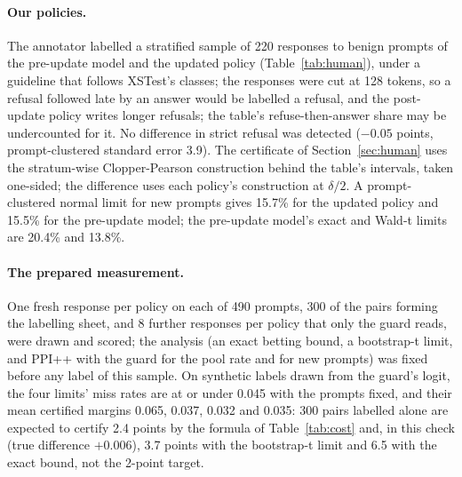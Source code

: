 \paragraph{Our policies.} The annotator labelled a stratified sample of 220 responses to benign prompts of the pre-update
model and the updated policy (Table~\ref{tab:human}), under a guideline that follows XSTest's classes; the responses were
cut at 128 tokens, so a refusal followed late by an answer would be labelled a refusal, and the post-update policy
writes longer refusals; the table's refuse-then-answer share may be undercounted for it. No difference in strict refusal was detected ($-0.05$ points, prompt-clustered standard error 3.9).
The certificate of Section~\ref{sec:human} uses the stratum-wise Clopper-Pearson construction behind the table's
intervals, taken one-sided; the difference uses each policy's construction at $\delta/2$. A prompt-clustered normal limit
for new prompts gives 15.7\% for the updated policy and 15.5\% for the pre-update model; the pre-update model's exact and
Wald-t limits are 20.4\% and 13.8\%.

\begin{table}[t]
\centering
\scriptsize
\setlength{\tabcolsep}{2pt}
\resizebox{\ifdim\width>\textwidth\textwidth\else\width\fi}{!}{}
\caption{Prompt pairs needed to certify a margin on the difference of the two strict refusal rates at $\delta=0.05$, by
normal-type formula at the sheet's rates (difference $-0.0005$, pairing correlation 0.66, guard $\rho^2$ 0.6). The guard
columns assume a gain of 2.5; a design check measured about 1.4, so they are optimistic.}
\label{tab:cost}
\end{table}

\paragraph{The prepared measurement.} One fresh response per policy on each of 490 prompts, 300 of the pairs forming the
labelling sheet, and 8 further responses per policy that only the guard reads, were drawn and scored; the analysis (an
exact betting bound, a bootstrap-t limit, and PPI++ with the guard for the pool rate and for new prompts) was fixed
before any label of this sample. On synthetic labels drawn from the guard's logit, the four limits' miss rates are at or
under 0.045 with the prompts fixed, and their mean certified margins 0.065, 0.037, 0.032 and 0.035: 300 pairs labelled
alone are expected to certify 2.4 points by the formula of Table~\ref{tab:cost} and, in this check (true difference $+0.006$), 3.7 points with the bootstrap-t limit and 6.5 with the exact bound, not the 2-point target.

